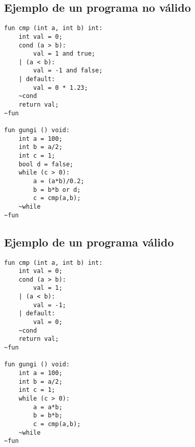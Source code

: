\documentclass[12pt]{article}
\begin{document}
\subsection{Ejemplo de un programa no válido}
\begin{verbatim}
fun cmp (int a, int b) int:
    int val = 0;
    cond (a > b):
        val = 1 and true;
    | (a < b):
        val = -1 and false;
    | default:
        val = 0 * 1.23;
    ~cond
    return val;
~fun

fun gungi () void:
    int a = 100;
    int b = a/2;
    int c = 1;
    bool d = false;
    while (c > 0):
        a = (a*b)/0.2;
        b = b*b or d;
        c = cmp(a,b);
    ~while
~fun
\end{verbatim}

\subsection{Ejemplo de un programa válido}
\begin{verbatim}
fun cmp (int a, int b) int:
    int val = 0;
    cond (a > b):
        val = 1;
    | (a < b):
        val = -1;
    | default:
        val = 0;
    ~cond
    return val;
~fun

fun gungi () void:
    int a = 100;
    int b = a/2;
    int c = 1;
    while (c > 0):
        a = a*b;
        b = b*b;
        c = cmp(a,b);
    ~while
~fun


\end{verbatim}
\end{document}
